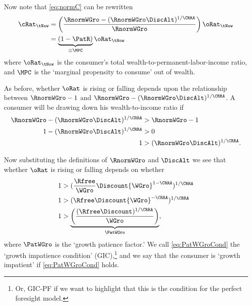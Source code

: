 Now note that \eqref{eq:normC} can be rewritten
\begin{equation}\begin{gathered}\begin{aligned}
        \cRat_{\tNow} & =  \left(\frac{\RnormWGro-(\RnormWGro\DiscAlt)^{1/\CRRA}}{\RnormWGro}\right)\oRat_{\tNow}
\\ & =  \underbrace{(1 - \PatR)}_{\equiv \MPC} \oRat_{\tNow}
\end{aligned}\end{gathered}\end{equation}
where $\oRat_{\tNow}$ is the consumer's total wealth-to-permanent-labor-income
ratio, and $\MPC$ is the `marginal propensity to consume' out of wealth.

As before, whether $\oRat$ is rising or falling depends upon the
relationship between $\RnormWGro-1$ and
$\RnormWGro-(\RnormWGro\DiscAlt)^{1/\CRRA}$.  A consumer will be
drawing down his wealth-to-income ratio if
\begin{equation}\begin{gathered}\begin{aligned}
        \RnormWGro-(\RnormWGro\DiscAlt)^{1/\CRRA} & >  \RnormWGro-1  \\
        1-(\RnormWGro\DiscAlt)^{1/\CRRA} & >  0  \\
        1 & >  (\RnormWGro\DiscAlt)^{1/\CRRA}
.
\end{aligned}\end{gathered}\end{equation}

Now substituting the definitions of $\RnormWGro$ and $\DiscAlt$
we see that whether $\oRat$ is rising or falling depends on whether
\begin{equation}\begin{gathered}\begin{aligned}
        1 & >  (\frac{\Rfree}{{\WGro}}\Discount {\WGro}^{1-\CRRA})^{1/\CRRA}
\\  1 & >  (\Rfree\Discount {\WGro}^{-\CRRA})^{1/\CRRA}
\\  1 & >  \underbrace{\left(\frac{(\Rfree\Discount)^{1/\CRRA}}{\WGro}\right)}_{\PatWGro} \label{eq:PatWGroCond}
,
\end{aligned}\end{gathered}\end{equation}
where $\PatWGro$ is the `growth patience factor.'  We call \eqref{eq:PatWGroCond} the `growth impatience condition' (GIC),\footnote{Or, GIC-PF if we want to highlight that this is the condition for the perfect foresight model.} and we say that the consumer is
`growth impatient' if \eqref{eq:PatWGroCond} holds.

